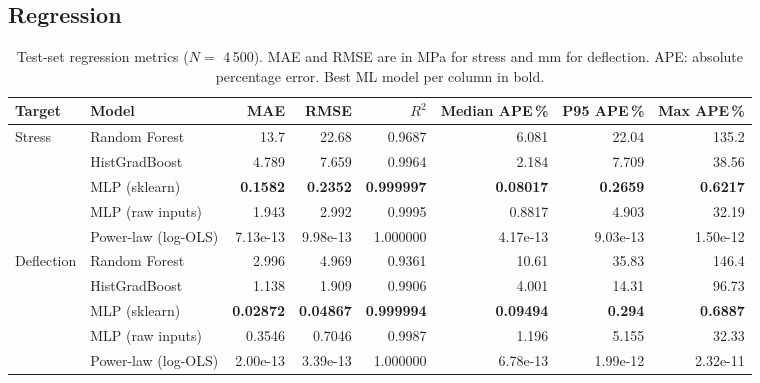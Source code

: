 \documentclass[11pt,a4paper]{article}
\begin{document}
\subsection{Regression}
\begin{table}[H]\centering\footnotesize\setlength{\tabcolsep}{4pt}
\caption{Test-set regression metrics ($N=$ 4\,500). MAE and RMSE are in MPa for stress and mm for deflection.
APE: absolute percentage error. Best ML model per column in bold.}
\label{tab:reg}
\begin{tabular}{llrrrrrr}
\toprule
Target & Model & MAE & RMSE & $R^2$ & Median APE\,\% & P95 APE\,\% & Max APE\,\%\\
\midrule
Stress & Random Forest & 13.7 & 22.68 & 0.9687 & 6.081 & 22.04 & 135.2\\
 & HistGradBoost & 4.789 & 7.659 & 0.9964 & 2.184 & 7.709 & 38.56\\
 & MLP (sklearn) & \textbf{0.1582} & \textbf{0.2352} & \textbf{0.999997} & \textbf{0.08017} & \textbf{0.2659} & \textbf{0.6217}\\
 & MLP (raw inputs) & 1.943 & 2.992 & 0.9995 & 0.8817 & 4.903 & 32.19\\
 & Power-law (log-OLS) & 7.13e-13 & 9.98e-13 & 1.000000 & 4.17e-13 & 9.03e-13 & 1.50e-12\\
\midrule
Deflection & Random Forest & 2.996 & 4.969 & 0.9361 & 10.61 & 35.83 & 146.4\\
 & HistGradBoost & 1.138 & 1.909 & 0.9906 & 4.001 & 14.31 & 96.73\\
 & MLP (sklearn) & \textbf{0.02872} & \textbf{0.04867} & \textbf{0.999994} & \textbf{0.09494} & \textbf{0.294} & \textbf{0.6887}\\
 & MLP (raw inputs) & 0.3546 & 0.7046 & 0.9987 & 1.196 & 5.155 & 32.33\\
 & Power-law (log-OLS) & 2.00e-13 & 3.39e-13 & 1.000000 & 6.78e-13 & 1.99e-12 & 2.32e-11\\

\bottomrule
\end{tabular}
\end{table}
\end{document}
